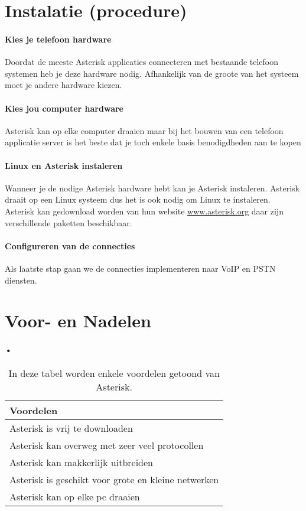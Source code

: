 \documentclass[12pt,a4paper]{report}
\begin{document}
\section{Instalatie (procedure)}
\paragraph{Kies je telefoon hardware}
Doordat de meeste Asterisk applicaties connecteren met bestaande telefoon systemen heb je deze hardware nodig. Afhankelijk van de groote van het systeem moet je andere hardware kiezen.

\paragraph{Kies jou computer hardware}
Asterisk kan op elke computer draaien maar bij het bouwen van een telefoon applicatie server is het beste dat je toch enkele basis benodigdheden aan te kopen

\paragraph{Linux en Asterisk instaleren}
Wanneer je de nodige Asterisk hardware hebt kan je Asterisk instaleren. Asterisk draait op een Linux systeem dus het is ook nodig om Linux te instaleren. Asterisk kan gedownload worden van hun website \label{link}\url{www.asterisk.org} daar zijn verschillende paketten beschikbaar.

\paragraph{Configureren van de connecties}
Als laatste stap gaan we de connecties implementeren naar VoIP en PSTN diensten.

\section{Voor- en Nadelen}
\paragraph{•}
\begin{table} [h]
\begin{tabular}{ | l | }
  \hline
  Voordelen\\
  \hline
  Asterisk is vrij te downloaden\\
  Asterisk kan overweg met zeer veel protocollen\\
  Asterisk kan makkerlijk uitbreiden\\
  Asterisk is geschikt voor grote en kleine netwerken\\
  Asterisk kan op elke pc draaien\\
  \hline
\end{tabular}
\caption[Voordelen Asterisk]{In deze tabel worden enkele voordelen getoond van Asterisk.}
\end{table}
\end{document}
